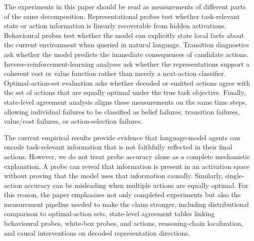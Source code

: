 \documentclass[final]{sparreport}
\begin{document}
The experiments in this paper should be read as measurements of different parts of the same decomposition. Representational probes test whether task-relevant state or action information is linearly recoverable from hidden activations. Behavioural probes test whether the model can explicitly state local facts about the current environment when queried in natural language. Transition diagnostics ask whether the model predicts the immediate consequences of candidate actions. Inverse-reinforcement-learning analyses ask whether the representations support a coherent cost or value function rather than merely a next-action classifier. Optimal-action-set evaluation asks whether decoded or emitted actions agree with the set of actions that are equally optimal under the true task objective. Finally, state-level agreement analysis aligns these measurements on the same time steps, allowing individual failures to be classified as belief failures, transition failures, value/cost failures, or action-selection failures.

The current empirical results provide evidence that language-model agents can encode task-relevant information that is not faithfully reflected in their final actions. However, we do not treat probe accuracy alone as a complete mechanistic explanation. A probe can reveal that information is present in an activation space without proving that the model uses that information causally. Similarly, single-action accuracy can be misleading when multiple actions are equally optimal. For this reason, the paper emphasizes not only completed experiments but also the measurement pipeline needed to make the claim stronger, including distributional comparison to optimal-action sets, state-level agreement tables linking behavioural probes, white-box probes, and actions, reasoning-chain localization, and causal interventions on decoded representation directions.
\end{document}
